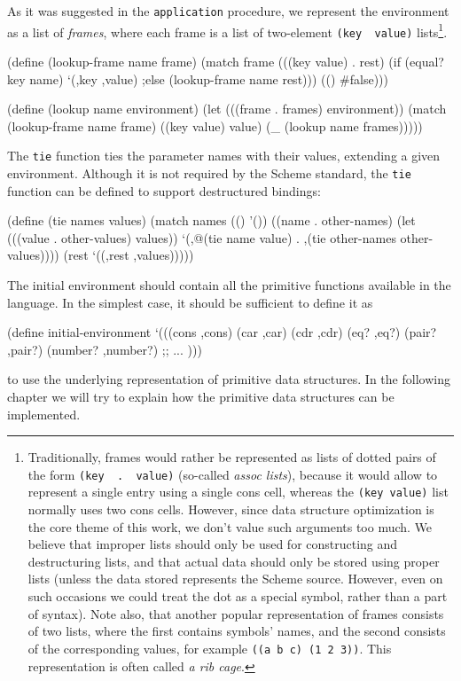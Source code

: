 As it was suggested in the \texttt{application} procedure, we represent
the environment as a list of \emph{frames}, where each frame is a list
of two-element \texttt{(key\,\,value)} lists\footnote{
  Traditionally, frames would rather be represented as lists of dotted
  pairs of the form \texttt{(key\,\,.\,\,value)} (so-called \textit{assoc lists}),
  because it would allow to represent a single entry using a single cons
  cell, whereas the \texttt{(key value)} list normally uses two cons
  cells. However, since data structure optimization is the core theme
  of this work, we don't value such arguments too much. We believe that
  improper lists should only be used for constructing and destructuring
  lists, and that actual data should only be stored using proper lists
  (unless the data stored represents the Scheme source. However, even
  on such occasions we could treat the dot as a special symbol, rather
  than a part of syntax).
  Note also, that another popular representation of frames consists
  of two lists, where the first contains symbols' names, and the
  second consists of the corresponding values, for example
  \texttt{((a b c) (1 2 3))}. This representation is often called
  \textit{a rib cage}\cite{Dybvig1987}.
}.

\begin{Snippet}
(define (lookup-frame name frame)
  (match frame
    (((key value) . rest)
     (if (equal? key name)
       `(,key ,value)
     ;else
       (lookup-frame name rest)))
    (()
     #false)))
\end{Snippet}
\begin{Snippet}    
(define (lookup name environment)
  (let (((frame . frames) environment))
    (match (lookup-frame name frame)
      ((key value)
       value)
      (_
       (lookup name frames)))))
\end{Snippet}

The \texttt{tie} function ties the parameter names with their
values, extending a given environment. Although it is not required
by the Scheme standard, the \texttt{tie} function can be defined
to support destructured bindings:

\begin{Snippet}
(define (tie names values)
  (match names
    (()
     '())
    ((name . other-names)
     (let (((value . other-values) values))
       `(,@(tie name value) . ,(tie other-names other-values))))
    (rest
     `((,rest ,values)))))
\end{Snippet}

The initial environment should contain all the primitive functions
available in the language. In the simplest case, it should be sufficient
to define it as

\begin{Snippet}
  (define initial-environment
    `(((cons ,cons)
       (car ,car)
       (cdr ,cdr)
       (eq? ,eq?)
       (pair? ,pair?)
       (number? ,number?)
      ;; ...
      )))
\end{Snippet}

to use the underlying representation of primitive data structures.
In the following chapter we will try to explain how the
primitive data structures can be implemented.

